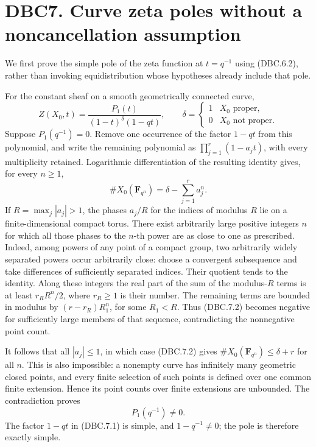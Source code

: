\documentclass[
]{report}
\newcounter{none} %
\begin{document}
\section{DBC7. Curve zeta poles without a noncancellation
assumption}\label{dbc7.-curve-zeta-poles-without-a-noncancellation-assumption}

We first prove the simple pole of the zeta function at \(t=q^{-1}\)
using (DBC.6.2), rather than invoking equidistribution whose hypotheses
already include that pole.

For the constant sheaf on a smooth geometrically connected curve, \[
Z(X_0,t)=\frac{P_1(t)}{(1-t)^\delta(1-qt)},
\qquad \delta=\begin{cases}1&X_0\text{ proper},\\0&X_0\text{ not proper}.\end{cases}
\tag{DBC.7.1}
\] Suppose \(P_1(q^{-1})=0\). Remove one occurrence of the factor
\(1-qt\) from this polynomial, and write the remaining polynomial as
\(\prod_{j=1}^r(1-a_jt)\), with every multiplicity retained. Logarithmic
differentiation of the resulting identity gives, for every \(n\ge1\), \[
\#X_0(\mathbf F_{q^n})=\delta-\sum_{j=1}^r a_j^n.
\tag{DBC.7.2}
\] If \(R=\max_j|a_j|>1\), the phases \(a_j/R\) for the indices of
modulus \(R\) lie on a finite-dimensional compact torus. There exist
arbitrarily large positive integers \(n\) for which all those phases to
the \(n\)-th power are as close to one as prescribed. Indeed, among
powers of any point of a compact group, two arbitrarily widely separated
powers occur arbitrarily close: choose a convergent subsequence and take
differences of sufficiently separated indices. Their quotient tends to
the identity. Along these integers the real part of the sum of the
modulus-\(R\) terms is at least \(r_R R^n/2\), where \(r_R\ge1\) is
their number. The remaining terms are bounded in modulus by
\((r-r_R)R_1^n\), for some \(R_1<R\). Thus (DBC.7.2) becomes negative
for sufficiently large members of that sequence, contradicting the
nonnegative point count.

It follows that all \(|a_j|\le1\), in which case (DBC.7.2) gives
\(\#X_0(\mathbf F_{q^n})\le\delta+r\) for all \(n\). This is also
impossible: a nonempty curve has infinitely many geometric closed
points, and every finite selection of such points is defined over one
common finite extension. Hence its point counts over finite extensions
are unbounded. The contradiction proves \[
P_1(q^{-1})\ne0.
\tag{DBC.7.3}
\] The factor \(1-qt\) in (DBC.7.1) is simple, and \(1-q^{-1}\ne0\); the
pole is therefore exactly simple.
\end{document}

